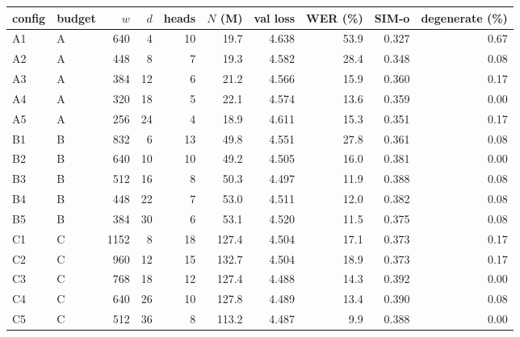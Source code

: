 \begin{tabular}{llrrrrrrrr}
\toprule
config & budget & $w$ & $d$ & heads & $N$ (M) & val loss & WER (\%) & SIM-o & degenerate (\%) \\
\midrule
A1 & A & 640 & 4 & 10 & 19.7 & 4.638 & 53.9 & 0.327 & 0.67 \\
A2 & A & 448 & 8 & 7 & 19.3 & 4.582 & 28.4 & 0.348 & 0.08 \\
A3 & A & 384 & 12 & 6 & 21.2 & 4.566 & 15.9 & 0.360 & 0.17 \\
A4 & A & 320 & 18 & 5 & 22.1 & 4.574 & 13.6 & 0.359 & 0.00 \\
A5 & A & 256 & 24 & 4 & 18.9 & 4.611 & 15.3 & 0.351 & 0.17 \\
B1 & B & 832 & 6 & 13 & 49.8 & 4.551 & 27.8 & 0.361 & 0.08 \\
B2 & B & 640 & 10 & 10 & 49.2 & 4.505 & 16.0 & 0.381 & 0.00 \\
B3 & B & 512 & 16 & 8 & 50.3 & 4.497 & 11.9 & 0.388 & 0.08 \\
B4 & B & 448 & 22 & 7 & 53.0 & 4.511 & 12.0 & 0.382 & 0.08 \\
B5 & B & 384 & 30 & 6 & 53.1 & 4.520 & 11.5 & 0.375 & 0.08 \\
C1 & C & 1152 & 8 & 18 & 127.4 & 4.504 & 17.1 & 0.373 & 0.17 \\
C2 & C & 960 & 12 & 15 & 132.7 & 4.504 & 18.9 & 0.373 & 0.17 \\
C3 & C & 768 & 18 & 12 & 127.4 & 4.488 & 14.3 & 0.392 & 0.00 \\
C4 & C & 640 & 26 & 10 & 127.8 & 4.489 & 13.4 & 0.390 & 0.08 \\
C5 & C & 512 & 36 & 8 & 113.2 & 4.487 & 9.9 & 0.388 & 0.00 \\
\bottomrule
\end{tabular}
